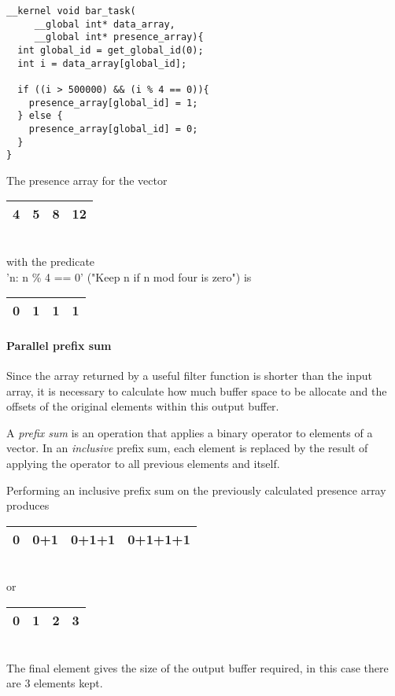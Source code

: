     \begin{verbatim}
__kernel void bar_task(
     __global int* data_array,
     __global int* presence_array){
  int global_id = get_global_id(0);
  int i = data_array[global_id];

  if ((i > 500000) && (i % 4 == 0)){
    presence_array[global_id] = 1;
  } else {
    presence_array[global_id] = 0;
  }
}
\end{verbatim}
    The presence array for the vector
    \begin{tabular}{ | c | c | c | c |}
      \hline
        4 & 5 & 8 & 12 \\
      \hline
    \end{tabular}
    \\
    with the predicate
    \\
    'n: n \% 4 == 0' ("Keep n if n mod four is zero") is
    \\
   \begin{tabular}{ | c | c | c | c |}
      \hline
        0 & 1 & 1 & 1 \\
      \hline
    \end{tabular}
 
    \paragraph{Parallel prefix sum}
    Since the array returned by a useful filter function is shorter than the input array, it is necessary to calculate how much buffer space to be allocate and the offsets of the original elements within this output buffer.

    A \emph{prefix sum} is an operation that applies a binary operator to elements of a vector. In an \emph{inclusive} prefix sum, each element is replaced by the result of applying the operator to all previous elements and itself.

  Performing an inclusive prefix sum on the previously calculated presence array produces
  \begin{tabular}{ | c | c | c | c |}
    \hline
      0 & 0+1 & 0+1+1 & 0+1+1+1 \\
    \hline
  \end{tabular}
    \\ or \\
  \begin{tabular}{ | c | c | c | c |}
    \hline
      0 & 1 & 2 & 3 \\
    \hline
  \end{tabular}
\\
The final element gives the size of the output buffer required, in this case there are $3$ elements kept.

